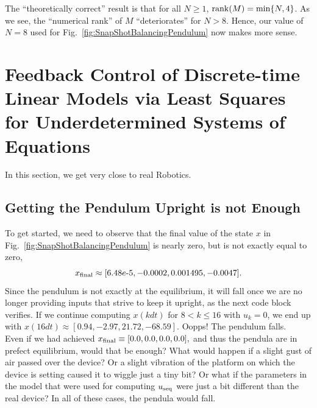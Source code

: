 The ``theoretically correct'' result is that for all $N\ge 1$, $\mathrm{rank}(M) = \min\{N,4\}$. As we see, the ``numerical rank'' of $M$ ``deteriorates'' for $N > 8$. Hence, our value of $N=8$ used for Fig.~\ref{fig:SnapShotBalancingPendulum} now makes more sense.

\section{Feedback Control of Discrete-time Linear Models via Least Squares for Underdetermined Systems of Equations}

In this section, we get very close to real Robotics. 

\subsection{Getting the Pendulum Upright is not Enough} 

To get started, we need to observe that the final value of the state $x$ in Fig.~\ref{fig:SnapShotBalancingPendulum} is nearly zero, but is not exactly equal to zero,
$$ x_{\rm final} \approx [6.48e\text{-}5, -0.0002, 0.001495,-0.0047]. $$
Since the pendulum is not exactly at the equilibrium, it will fall once we are no longer providing inputs that strive to keep it upright, as the next code block verifies. If we continue computing $x(kdt)$ for $ 8 < k \le 16$ with $u_k=0$, we end up with $x(16dt)\approx  [0.94, -2.97, 21.72, -68.59] $. Oopps! The pendulum falls. \\

Even if we had achieved $x_{\rm final} \equiv [0.0, 0.0, 0.0, 0.0],$ and thus the pendula are in prefect equilibrium, would that be enough? What would happen if a slight gust of air passed over the device? Or a slight vibration of the platform on which the device is setting caused it to wiggle just a tiny bit? Or what if the parameters in the model that were used for computing $u_{\rm seq}$ were just a bit different than the real device? In all of these cases, the pendula would fall. 

\vspace*{.2cm}


